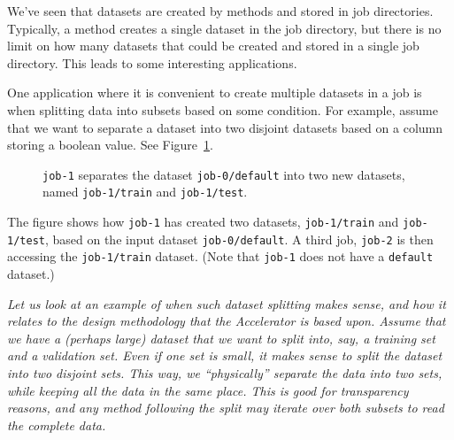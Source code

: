\documentclass[a4paper]{article}
\begin{document}
We've seen that datasets are created by methods and stored in job
directories.  Typically, a method creates a single dataset in the job
directory, but there is no limit on how many datasets that could be
created and stored in a single job directory.  This leads to some
interesting applications.

One application where it is convenient to create multiple datasets in
a job is when splitting data into subsets based on some condition.
For example, assume that we want to separate a dataset into two
disjoint datasets based on a column storing a boolean value.  See
Figure~\ref{fig:dep_dataset_csvimport_chain}.

\begin{figure}[h!]
  \hspace{1cm}
  
    \caption{\texttt{job-1} separates the dataset
      \texttt{job-0/default} into two new datasets, named
      \texttt{job-1/train} and \texttt{job-1/test}.}
    \label{fig:dep_dataset_csvimport_chain}
\end{figure}

The figure shows how \texttt{job-1} has created two datasets,
\texttt{job-1/train} and \texttt{job-1/test}, based on the input
dataset \texttt{job-0/default}.  A third job, \texttt{job-2} is then
accessing the \texttt{job-1/train} dataset.  (Note that \texttt{job-1}
does not have a \texttt{default} dataset.)




\emph{
Let us look at an example of when such dataset splitting
makes sense, and how it relates to the design methodology that the
Accelerator is based upon.  Assume that we have a (perhaps large)
dataset that we want to split into, say, a training set and a
validation set.  Even if one set is small, it makes sense to split the
dataset into two disjoint sets.  This way, we ``physically'' separate
the data into two sets, while keeping all the data in the same place.
This is good for transparency reasons, and any method following the
split may iterate over both subsets to read the complete data.
}
\clearpage
\end{document}
